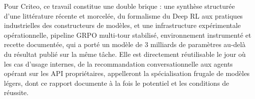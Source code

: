 \documentclass[11pt,a4paper]{article}
\begin{document}
Pour Criteo, ce travail constitue une double brique : une synthèse structurée d'une littérature récente et morcelée, du formalisme du Deep RL aux pratiques industrielles des constructeurs de modèles, et une infrastructure expérimentale opérationnelle, pipeline GRPO multi-tour stabilisé, environnement instrumenté et recette documentée, qui a porté un modèle de 3 milliards de paramètres au-delà du résultat publié sur la même tâche. Elle est directement réutilisable le jour où les cas d'usage internes, de la recommandation conversationnelle aux agents opérant sur les API propriétaires, appelleront la spécialisation frugale de modèles légers, dont ce rapport documente à la fois le potentiel et les conditions de réussite.


















\newpage



\newpage
\end{document}
